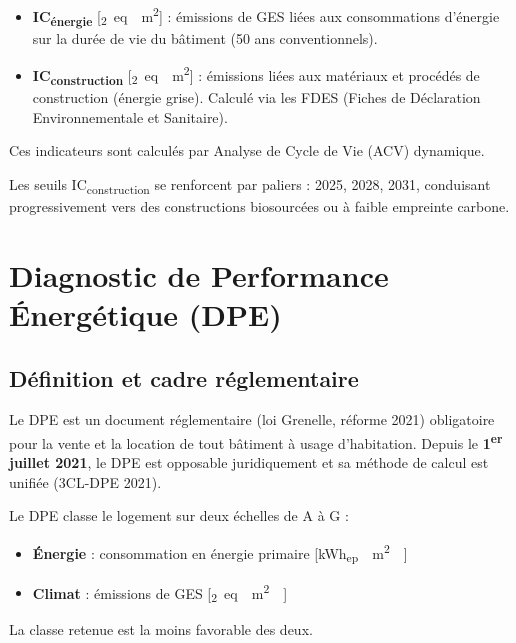 \begin{definition}[title=IC — Indicateurs carbone (nouveautés RE2020)]
\begin{itemize}
  \item \textbf{IC\textsubscript{énergie}} [\si{\kgCO_2eq \per \m^2}] : émissions de GES liées aux consommations d'énergie sur la durée de vie du bâtiment (50 ans conventionnels).
  \item \textbf{IC\textsubscript{construction}} [\si{\kgCO_2eq \per \m^2}] : émissions liées aux matériaux et procédés de construction (énergie grise). Calculé via les FDES (Fiches de Déclaration Environnementale et Sanitaire).
\end{itemize}
Ces indicateurs sont calculés par Analyse de Cycle de Vie (ACV) dynamique.
\end{definition}

Les seuils IC\textsubscript{construction} se renforcent par paliers : 2025, 2028, 2031, conduisant progressivement vers des constructions biosourcées ou à faible empreinte carbone.

\section{Diagnostic de Performance Énergétique (DPE)}

\subsection{Définition et cadre réglementaire}

Le DPE est un document réglementaire (loi Grenelle, réforme 2021) obligatoire pour la vente et la location de tout bâtiment à usage d'habitation. Depuis le \textbf{1\textsuperscript{er} juillet 2021}, le DPE est opposable juridiquement et sa méthode de calcul est unifiée (3CL-DPE 2021).

\begin{definition}[title=Étiquettes DPE]
Le DPE classe le logement sur deux échelles de A à G :
\begin{itemize}
  \item \textbf{Énergie} : consommation en énergie primaire [\si{\kWh_{ep} \per \m^2 \per \year}]
  \item \textbf{Climat} : émissions de GES [\si{\kgCO_2eq \per \m^2 \per \year}]
\end{itemize}
La classe retenue est la moins favorable des deux.
\end{definition}

